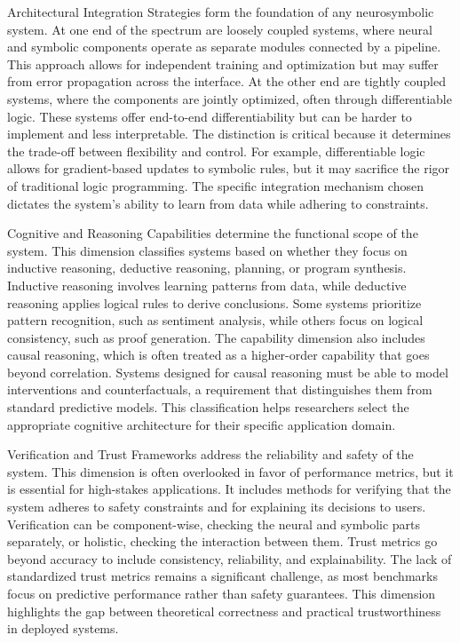 \documentclass{article}
\begin{document}
Architectural Integration Strategies form the foundation of any neurosymbolic system. At one end of the spectrum are loosely coupled systems, where neural and symbolic components operate as separate modules connected by a pipeline. This approach allows for independent training and optimization but may suffer from error propagation across the interface. At the other end are tightly coupled systems, where the components are jointly optimized, often through differentiable logic. These systems offer end-to-end differentiability but can be harder to implement and less interpretable. The distinction is critical because it determines the trade-off between flexibility and control. For example, differentiable logic allows for gradient-based updates to symbolic rules, but it may sacrifice the rigor of traditional logic programming. The specific integration mechanism chosen dictates the system's ability to learn from data while adhering to constraints.

Cognitive and Reasoning Capabilities determine the functional scope of the system. This dimension classifies systems based on whether they focus on inductive reasoning, deductive reasoning, planning, or program synthesis. Inductive reasoning involves learning patterns from data, while deductive reasoning applies logical rules to derive conclusions. Some systems prioritize pattern recognition, such as sentiment analysis, while others focus on logical consistency, such as proof generation. The capability dimension also includes causal reasoning, which is often treated as a higher-order capability that goes beyond correlation. Systems designed for causal reasoning must be able to model interventions and counterfactuals, a requirement that distinguishes them from standard predictive models. This classification helps researchers select the appropriate cognitive architecture for their specific application domain.

Verification and Trust Frameworks address the reliability and safety of the system. This dimension is often overlooked in favor of performance metrics, but it is essential for high-stakes applications. It includes methods for verifying that the system adheres to safety constraints and for explaining its decisions to users. Verification can be component-wise, checking the neural and symbolic parts separately, or holistic, checking the interaction between them. Trust metrics go beyond accuracy to include consistency, reliability, and explainability. The lack of standardized trust metrics remains a significant challenge, as most benchmarks focus on predictive performance rather than safety guarantees. This dimension highlights the gap between theoretical correctness and practical trustworthiness in deployed systems.
\end{document}
